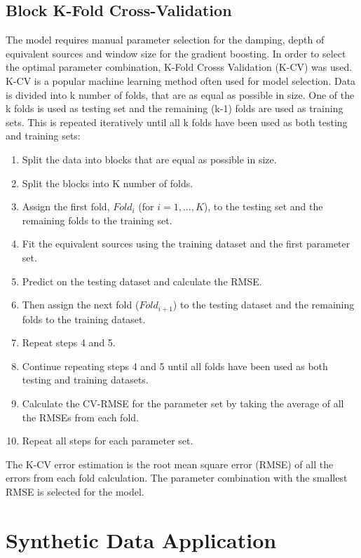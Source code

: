 \subsection{Block K-Fold Cross-Validation}
The model requires manual parameter selection for the damping, depth of equivalent sources and window size for the gradient boosting. In order to select the optimal parameter combination, K-Fold Crosss Validation (K-CV) was used. K-CV is a popular machine learning method often used for model selection. Data is divided into k number of folds, that are as equal as possible in size. One of the k folds is used as testing set and the remaining (k-1) folds are used as training sets. This is repeated iteratively until all k folds have been used as both testing and training sets:
\begin{enumerate}
    \item Split the data into blocks that are equal as possible in size.
    \item Split the blocks into K number of folds.
    \item Assign the first fold, $Fold_i$ (for $i= 1,..., K$), to the testing set and the remaining folds to the training set.
    \item Fit the equivalent sources using the training dataset and the first parameter set.
    \item Predict on the testing dataset and calculate the RMSE.
    \item Then assign the next fold ($Fold_{i+1}$) to the testing dataset and the remaining folds to the training dataset.
    \item Repeat steps 4 and 5.
    \item Continue repeating steps 4 and 5 until all folds have been used as both testing and training datasets.
    \item Calculate the CV-RMSE for the parameter set by taking the average of all the RMSEs from each fold.
    \item Repeat all steps for each parameter set.
\end{enumerate}
The K-CV error estimation is the root mean square error (RMSE) of all the errors from each fold calculation. The parameter combination with the smallest RMSE is selected for the model.
 


\section{Synthetic Data Application}

